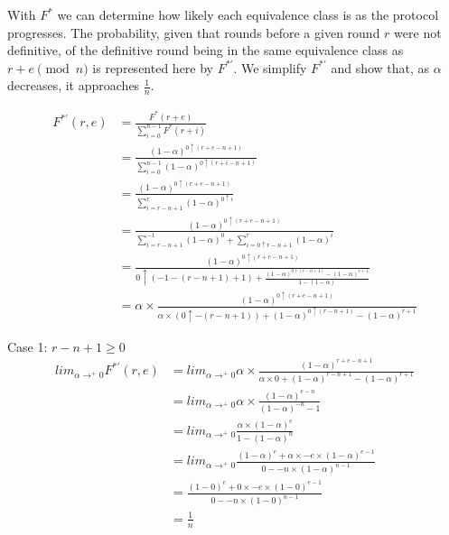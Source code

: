 \documentclass[12pt]{dalcsthesis}
\begin{document}
With $F^{*}$ we can determine how likely each equivalence class is as the protocol progresses. The probability, given that rounds before a given round $r$ were not definitive, of the definitive round being in the same equivalence class as $r+e \pmod{n}$ is represented here by $F^{*'}$. We simplify $F^{*'}$ and show that, as $\alpha$ decreases, it approaches $\frac{1}{n}$.

\begin{align*}
F^{*'}(r, e)
  &= \frac{F^{*}(r+e)}{\sum_{i=0}^{n-1} F^{*}(r+i)}
\\&= \frac{(1-\alpha)^{0 \uparrow (r + e - n + 1)}}{\sum_{i=0}^{n-1} (1-\alpha)^{0 \uparrow (r + i - n + 1)}}
\\&= \frac{(1-\alpha)^{0 \uparrow (r + e - n + 1)}}{\sum_{i=r-n+1}^{r} (1-\alpha)^{0 \uparrow i}}
\\&= \frac{(1-\alpha)^{0 \uparrow (r + e - n + 1)}}{\sum_{i=r-n+1}^{-1} (1-\alpha)^0 + \sum_{i=0 \uparrow {r-n+1}}^{r} (1-\alpha)^i}
\\&= \frac{(1-\alpha)^{0 \uparrow (r + e - n + 1)}}{0 \uparrow (-1 -(r-n+1) + 1) + \frac{(1-\alpha)^{0 \uparrow (r-n+1)} - (1-\alpha)^{r+1}}{1-(1-\alpha)}}
\\&= \alpha \times \frac{(1-\alpha)^{0 \uparrow (r + e - n + 1)}}{\alpha \times (0 \uparrow -(r-n+1)) + (1-\alpha)^{0 \uparrow (r-n+1)} - (1-\alpha)^{r+1}}
\end{align*}

Case 1: $r-n+1 \geq 0$ 
\begin{align*}
lim_{\alpha \rightarrow^{+} 0} F^{*'}(r, e)
  &= lim_{\alpha \rightarrow^{+} 0} \alpha \times \frac{(1-\alpha)^{r + e - n + 1}}{\alpha \times 0 + (1-\alpha)^{r-n+1} - (1-\alpha)^{r+1}}
\\&= lim_{\alpha \rightarrow^{+} 0} \alpha \times \frac{(1-\alpha)^{e - n}}{(1-\alpha)^{-n} - 1}
\\&= lim_{\alpha \rightarrow^{+} 0} \frac{\alpha \times (1-\alpha)^e}{1 - (1-\alpha)^n}
\\&= lim_{\alpha \rightarrow^{+} 0} \frac{(1-\alpha)^e + \alpha \times -e \times (1-\alpha)^{e-1}}{0 - -n \times (1-\alpha)^{n-1}}
\\&= \frac{(1-0)^e + 0 \times -e \times (1-0)^{e-1}}{0 - -n \times (1-0)^{n-1}}
\\&= \frac{1}{n}
\end{align*} 
\end{document}
